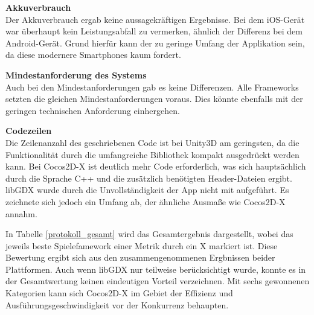 \bigskip
\textbf{Akkuverbrauch} \\
Der Akkuverbrauch ergab keine aussagekräftigen Ergebnisse. Bei dem iOS-Gerät war überhaupt kein Leistungsabfall zu vermerken, ähnlich der Differenz bei dem Android-Gerät. Grund hierfür kann der zu geringe Umfang der Applikation sein, da diese modernere Smartphones kaum fordert.


\bigskip
\textbf{Mindestanforderung des Systems} \\
Auch bei den Mindestanforderungen gab es keine Differenzen. Alle Frameworks setzten die gleichen Mindestanforderungen voraus. Dies könnte ebenfalls mit der geringen technischen Anforderung einhergehen.

\bigskip
\textbf{Codezeilen} \\
Die Zeilenanzahl des geschriebenen Code ist bei Unity3D am geringsten, da die Funktionalität durch die umfangreiche Bibliothek kompakt ausgedrückt werden kann. Bei Cocos2D-X ist deutlich mehr Code erforderlich, was sich hauptsächlich durch die Sprache C++ und die zusätzlich benötigten Header-Dateien ergibt. libGDX wurde durch die Unvollständigkeit der App nicht mit aufgeführt. Es zeichnete sich jedoch ein Umfang ab, der ähnliche Ausmaße wie Cocos2D-X annahm.

\bigskip
In Tabelle \ref{protokoll_gesamt} wird das Gesamtergebnis dargestellt, wobei das jeweils beste Spielefamework einer Metrik durch ein X markiert ist. Diese Bewertung ergibt sich aus den zusammengenommenen Ergbnissen beider Plattformen. Auch wenn libGDX nur teilweise berücksichtigt wurde, konnte es in der Gesamtwertung keinen eindeutigen Vorteil verzeichnen. Mit sechs gewonnenen Kategorien kann sich Cocos2D-X im Gebiet der Effizienz und Ausführungsgeschwindigkeit vor der Konkurrenz behaupten. 

